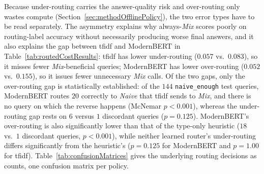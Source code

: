\documentclass[english, bibtex]{kththesis}               %
\numberwithin{listing}{chapter}
\providecommand{\DIFaddtex}[1]{{\protect\color{blue} \sf #1}} %
\providecommand{\DIFaddbegin}{} %
\providecommand{\DIFaddend}{} %
\providecommand{\DIFadd}[1]{\texorpdfstring{\DIFaddtex{#1}}{#1}} %
\begin{document}
Because under-routing carries the answer-quality risk and over-routing only wastes compute (Section~\ref{sec:methodOfflinePolicy}), the two error types have to be read separately. The asymmetry explains why always-\emph{Mix} scores poorly on routing-label accuracy without necessarily producing worse final answers, and it also explains the gap between \gls{tfidf} and ModernBERT in Table~\ref{tab:routedCostResults}: \gls{tfidf} has lower under-routing ($0.057$ vs.\ $0.083$), so it misses fewer \emph{Mix}-beneficial queries; ModernBERT has lower over-routing ($0.052$ vs.\ $0.155$), so it issues fewer unnecessary \emph{Mix} calls. Of the two gaps, only the over-routing gap is statistically established: of the $144$ \texttt{naive\_enough} test queries, ModernBERT routes $20$ correctly to \emph{Naive} that \gls{tfidf} sends to \emph{Mix}, and there is no query on which the reverse happens (McNemar $p < 0.001$), whereas the under-routing gap rests on $6$ versus $1$ discordant queries ($p = 0.125$). ModernBERT's over-routing is also significantly lower than that of the type-only heuristic ($18$ vs.\ $1$ discordant queries, $p < 0.001$), while neither learned router's under-routing differs significantly from the heuristic's ($p = 0.125$ for ModernBERT and $p = 1.00$ for \gls{tfidf}). \DIFaddbegin \DIFadd{Table~\ref{tab:confusionMatrices} gives the underlying routing decisions as counts, one confusion matrix per policy.
}\DIFaddend 
\end{document}
